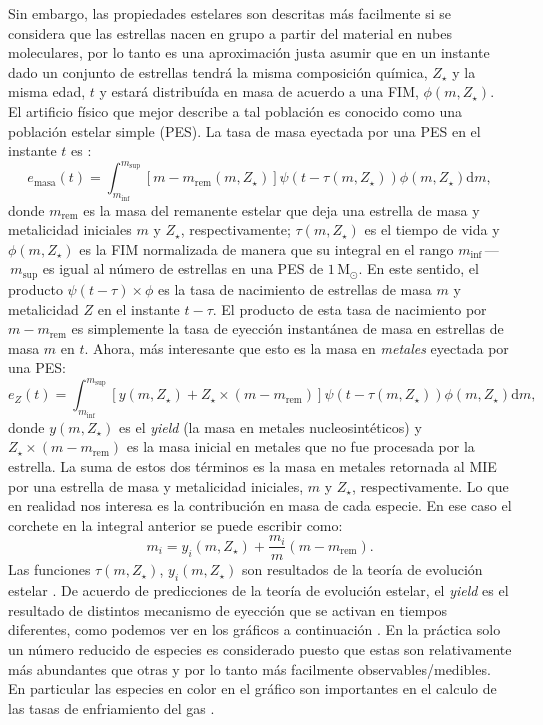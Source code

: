 \documentclass{article}
\begin{document}
%
Sin embargo, las propiedades estelares son descritas más facilmente si se considera que las
estrellas nacen en grupo a partir del material en nubes moleculares, por lo tanto es una
aproximación justa asumir que en un instante dado un conjunto de estrellas tendrá la misma
composición química, $Z_\star$ y la misma edad, $t$ y estará distribuída en masa de acuerdo a una
FIM, $\phi(m,Z_\star)$. El artificio físico que mejor describe a tal población es conocido como una
población estelar simple (PES). La tasa de masa eyectada por una PES en el instante $t$ es
\citep{Yates2013}:
%
$$
e_\text{masa}(t) = \int_{m_\text{inf}}^{m_\text{sup}}\left[m-m_\text{rem}(m,Z_\star)\right]\psi(t-\tau(m,Z_\star))\phi(m,Z_\star)\text{d}m,
$$
%
donde $m_\text{rem}$ es la masa del remanente estelar que deja una estrella de masa y metalicidad
iniciales $m$ y $Z_\star$, respectivamente; $\tau(m,Z_\star)$ es el tiempo de vida y
$\phi(m,Z_\star)$ es la FIM normalizada de manera que su integral en el rango
$m_\text{inf}\,$---$\,m_\text{sup}$ es igual al número de estrellas en una PES de $1\,$M$_\odot$. En
este sentido, el producto $\psi(t-\tau)\times\phi$ es la tasa de nacimiento de estrellas de masa $m$
y metalicidad $Z$ en el instante $t-\tau$. El producto de esta tasa de nacimiento por
$m-m_\text{rem}$ es simplemente la tasa de eyección instantánea de masa en estrellas de masa $m$ en
$t$. Ahora, más interesante que esto es la masa en \emph{metales} eyectada por una PES:
%
$$
e_Z(t) = \int_{m_\text{inf}}^{m_\text{sup}}\left[y(m,Z_\star)+Z_\star\times(m-m_\text{rem})\right]\psi(t-\tau(m,Z_\star))\phi(m,Z_\star)\text{d}m,
$$
%
donde $y(m,Z_\star)$ es el \emph{yield} (la masa en metales nucleosintéticos) y
$Z_\star\times(m-m_\text{rem})$ es la masa inicial en metales que no fue procesada por la estrella.
La suma de estos dos términos es la masa en metales retornada al MIE por una estrella de masa y
metalicidad iniciales, $m$ y $Z_\star$, respectivamente. Lo que en realidad nos interesa es la
contribución en masa de cada especie. En ese caso el corchete en la integral anterior se puede
escribir como:
%
$$
m_i = y_i(m,Z_\star) + \frac{m_i}{m}(m-m_\text{rem}).
$$
%
Las funciones $\tau(m,Z_\star)$, $y_i(m,Z_\star)$ son resultados de la teoría de evolución estelar
\citep[e.\,g.][]{Portinari1998, Marigo2001}.
De acuerdo de predicciones de la teoría de evolución estelar, el \emph{yield} es el resultado de
distintos mecanismo de eyección que se activan en tiempos diferentes, como podemos ver en los
gráficos a continuación \citep{Yates2013}.
En la práctica solo un número reducido de especies es considerado puesto que estas son relativamente
más abundantes que otras y por lo tanto más facilmente observables/medibles. En particular las
especies en color en el gráfico son importantes en el calculo de las tasas de enfriamiento del gas
\citep{Wiersma2009a}.
\end{document}
